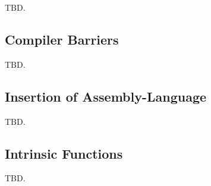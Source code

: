 TBD.


\subsection{Compiler Barriers}
\label{scco0:scba0}

TBD.


\subsection{Insertion of Assembly-Language}
\label{scco0:sial0}

TBD.


\subsection{Intrinsic Functions}
\label{scco0:sifu0}

TBD.
